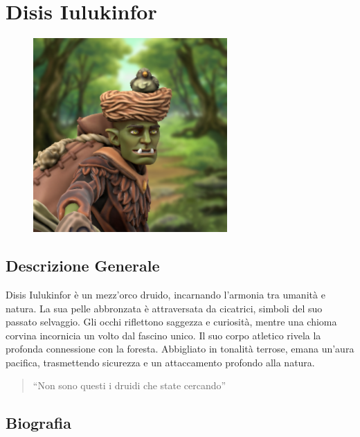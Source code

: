 \section{Disis Iulukinfor}\label{disis-iulukinfor}


\begin{figure}
\centering
\includegraphics{Disis_Iulukinfor-Token.png}
\end{figure}

\subsection{Descrizione Generale}\label{descrizione-generale}



Disis Iulukinfor è un mezz'orco druido, incarnando l'armonia tra umanità
e natura. La sua pelle abbronzata è attraversata da cicatrici, simboli
del suo passato selvaggio. Gli occhi riflettono saggezza e curiosità,
mentre una chioma corvina incornicia un volto dal fascino unico. Il suo
corpo atletico rivela la profonda connessione con la foresta. Abbigliato
in tonalità terrose, emana un'aura pacifica, trasmettendo sicurezza e un
attaccamento profondo alla natura.

\begin{quote}
``Non sono questi i druidi che state cercando''
\end{quote}

\subsection{Biografia}\label{biografia}


